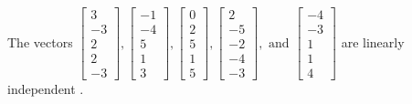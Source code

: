 \begin{exercise}
\begin{exerciseStatement}
  \end{exerciseStatement}
  \begin{exerciseAnswer}
   The vectors \(\left[\begin{array}{r}
3 \\
-3 \\
2 \\
2 \\
-3
\end{array}\right] , \left[\begin{array}{r}
-1 \\
-4 \\
5 \\
1 \\
3
\end{array}\right] , \left[\begin{array}{r}
0 \\
2 \\
5 \\
1 \\
5
\end{array}\right] , \left[\begin{array}{r}
2 \\
-5 \\
-2 \\
-4 \\
-3
\end{array}\right] , \text{ and } \left[\begin{array}{r}
-4 \\
-3 \\
1 \\
1 \\
4
\end{array}\right]\) are 
  	 linearly independent  .
  


  \end{exerciseAnswer}
\end{exercise}